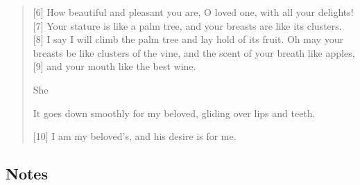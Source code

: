 \begin{quote}
    [6] How beautiful and pleasant you are,
        O loved one, with all your delights!
    [7] Your stature is like a palm tree,
        and your breasts are like its clusters.
    [8] I say I will climb the palm tree
        and lay hold of its fruit.
    Oh may your breasts be like clusters of the vine,
        and the scent of your breath like apples,
    [9] and your mouth like the best wine.


    She

    It goes down smoothly for my beloved,
        gliding over lips and teeth.


    [10] I am my beloved’s,
        and his desire is for me.
  \end{quote}
\subsection*{Notes}
